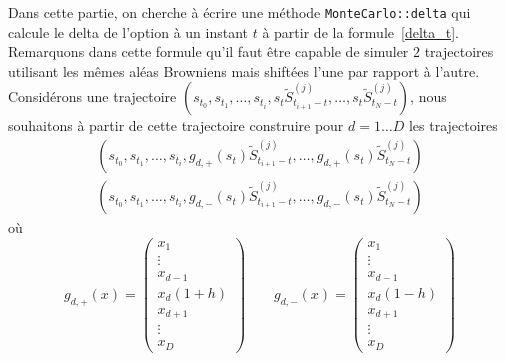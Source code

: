 \documentclass[a4paper,11pt]{article}
\def\var#1{{\tt #1}}
\begin{document}
Dans cette partie, on cherche à écrire une méthode \var{MonteCarlo::delta} qui calcule le delta de l'option à un instant $t$ à partir de la formule~\eqref{delta_t}.  Remarquons dans cette formule qu'il faut être capable de simuler $2$ trajectoires utilisant les mêmes aléas Browniens mais shiftées l'une par rapport à l'autre. Considérons une trajectoire $(s_{t_0}, s_{t_1}, \dots, s_{t_i}, s_t \tilde S_{t_{i+1} - t}^{(j)}, \dots,  s_t \tilde S_{t_N - t}^{(j)})$, nous souhaitons à partir de cette trajectoire construire pour $d=1\dots D$ les trajectoires
\begin{align*}
  (s_{t_0}, s_{t_1}, \dots, s_{t_i}, g_{d,+}(s_t) \tilde S_{t_{i+1} - t}^{(j)},
 \dots,  g_{d,+}(s_t) \tilde S_{t_N - t}^{(j)})  \\
 (s_{t_0}, s_{t_1}, \dots, s_{t_i}, g_{d,-}(s_t) \tilde S_{t_{i+1} - t}^{(j)},
 \dots, g_{d,-}(s_t)   \tilde S_{t_N - t}^{(j)})
\end{align*}
où
\begin{equation*}
  g_{d,+}(x)  = \left(\begin{array}{c}
    x_1 \\
    \vdots\\
    x_{d-1} \\
    x_d (1+h) \\
    x_{d+1} \\
    \vdots\\
    x_D
  \end{array}\right) \qquad g_{d,-}(x)  = \left(\begin{array}{c}
    x_1 \\
    \vdots\\
    x_{d-1} \\
    x_d (1-h) \\
    x_{d+1} \\
    \vdots\\
    x_D
  \end{array}\right)
\end{equation*}
\end{document}
